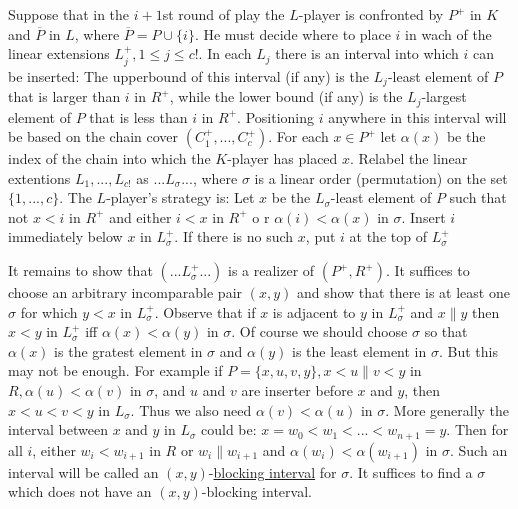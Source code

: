 \documentclass[twoside]{article}
\begin{document}
Suppose that in the $i+1$st round of play the $L$-player is confronted by $P^+$ in
$K$ and $\overline{P}$ in $L$, where $\overline{P} = P \cup \{i\}$. He must decide where to place $i$
in wach of the linear extensions $L^+_j, 1\leq j\leq c!$. In each $L_j$ there is an
interval into which $i$ can be inserted: The upperbound of this interval (if any)
is the $L_j$-least element of $P$ that is larger than $i$ in $R^+$, while the lower
bound (if any) is the $L_j$-largest element of $P$ that is less than $i$ in $R^+$.
Positioning $i$ anywhere in this interval will be based on the chain cover $(C^+_1,...,C^+_c)$.
For each $x \in P^+$ let $\alpha (x)$ be the index of the chain into which the $K$-player has
placed $x$. Relabel the linear extentions $L_1,...,L_{c!}$ as $...L_{\sigma}...$, where
$\sigma$ is a linear order (permutation) on the set $\{1,...,c\}$. The $L$-player's strategy
is: Let $x$ be the $L_{\sigma}$-least element of $P$ such that not $x<i$ in $R^+$ and either
$i<x$ in $R^+$ o r $\alpha (i) < \alpha (x)$ in $\sigma$. Insert $i$ immediately
below $x$ in $L^+_{\sigma}$. If there is no such $x$, put $i$ at the top of $L^+_{\sigma}$

It remains to show that $(...L^+_{\sigma}...)$ is a realizer of $(P^+,R^+)$. It
suffices to choose an arbitrary incomparable pair $(x,y)$ and show that there is 
at least one $\sigma$ for which $y<x$ in $L_{\sigma}^+$. Observe that if $x$ is adjacent to $y$ in $L^+_{\sigma}$
and $x \parallel y$ then $x<y$ in $L^+_{\sigma}$ iff $\alpha (x) < \alpha (y)$ in $\sigma$.
Of course we should choose $\sigma$ so that $\alpha (x)$ is the gratest element
in $\sigma$ and $\alpha (y)$ is the least element in $\sigma$. But this may not be 
enough. For example if $P =\{x,u,v,y\}, x<u\parallel v<y$ in $R, \alpha (u) < \alpha (v)$
in $\sigma$, and $u$ and $v$ are inserter before $x$ and $y$, then $x<u<v<y$ in $L_{\sigma}$.
Thus we also need $\alpha (v) < \alpha (u)$ in $\sigma$. More generally the interval between $x$
and $y$ in $L_{\sigma}$ could be: $x = w_0<w_1<...<w_{n+1} = y$. Then for all $i$, either
$w_i < w_{i+1}$ in $R$ or $w_i \parallel w_{i+1}$ and $\alpha (w_i) < \alpha (w_{i+1})$ in 
$\sigma$. Such an interval will be called an $(x,y)$-\underline{blocking interval} for $\sigma$.
It suffices to find a $\sigma$ which does not have an $(x,y)$-blocking interval.
\end{document}
